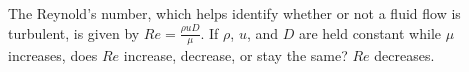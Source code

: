{The Reynold's number, which helps identify whether or not a fluid flow is turbulent, is given by $Re=\frac{\rho uD}{\mu}$. If $\rho$, $u$, and $D$ are held constant while $\mu$ increases, does $Re$ increase, decrease, or stay the same?}
{$Re$ decreases.}


